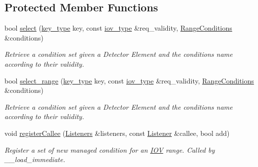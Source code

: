\subsection*{Protected Member Functions}
\begin{DoxyCompactItemize}
\item 
bool \hyperlink{class_d_d4hep_1_1_conditions_1_1_conditions_manager_object_a41d307dce9b135813e089d86f282bebf}{select} (\hyperlink{class_d_d4hep_1_1_conditions_1_1_conditions_manager_object_ac44eafc69174743e81d2f60e1f510719}{key\+\_\+type} key, const \hyperlink{class_d_d4hep_1_1_conditions_1_1_conditions_manager_object_a0190ec510ca46da4a1cc908ac3c3a1dd}{iov\+\_\+type} \&req\+\_\+validity, \hyperlink{namespace_d_d4hep_1_1_conditions_ae765f0140a33973a430280f02b6062f4}{Range\+Conditions} \&conditions)
\begin{DoxyCompactList}\small\item\em Retrieve a condition set given a Detector Element and the conditions name according to their validity. \end{DoxyCompactList}\item 
bool \hyperlink{class_d_d4hep_1_1_conditions_1_1_conditions_manager_object_a45b1d4f84a550788dbe24f0245ada7fb}{select\+\_\+range} (\hyperlink{class_d_d4hep_1_1_conditions_1_1_conditions_manager_object_ac44eafc69174743e81d2f60e1f510719}{key\+\_\+type} key, const \hyperlink{class_d_d4hep_1_1_conditions_1_1_conditions_manager_object_a0190ec510ca46da4a1cc908ac3c3a1dd}{iov\+\_\+type} \&req\+\_\+validity, \hyperlink{namespace_d_d4hep_1_1_conditions_ae765f0140a33973a430280f02b6062f4}{Range\+Conditions} \&conditions)
\begin{DoxyCompactList}\small\item\em Retrieve a condition set given a Detector Element and the conditions name according to their validity. \end{DoxyCompactList}\item 
void \hyperlink{class_d_d4hep_1_1_conditions_1_1_conditions_manager_object_ac945da1c9e23ba4e7db40221a38d4abc}{register\+Callee} (\hyperlink{class_d_d4hep_1_1_conditions_1_1_conditions_manager_object_aba0162524bc90a39e30bd5f1f0067ee2}{Listeners} \&listeners, const \hyperlink{class_d_d4hep_1_1_conditions_1_1_conditions_manager_object_ac4cd1e3a448bc1f8bae384d194f10c23}{Listener} \&callee, bool add)
\begin{DoxyCompactList}\small\item\em Register a set of new managed condition for an \hyperlink{class_d_d4hep_1_1_i_o_v}{I\+OV} range. Called by \+\_\+\+\_\+load\+\_\+immediate. \end{DoxyCompactList}\item 

\end{DoxyCompactItemize}
